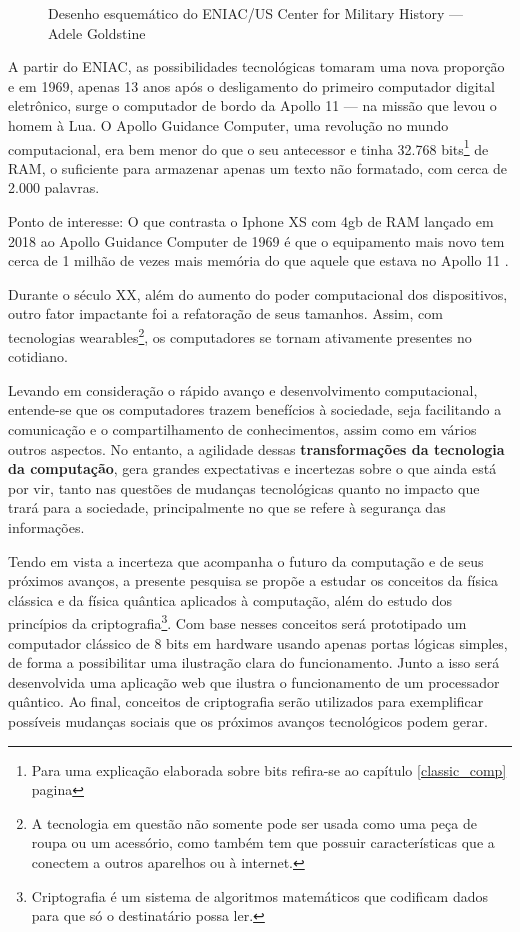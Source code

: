 \vspace{1cm}
\begin{figure}[H] \centering 
  \caption{\label{ENIAC_floor_layout} Desenho esquemático do ENIAC/US Center for Military History — Adele Goldstine} 
\end{figure}

A partir do ENIAC, as possibilidades tecnológicas tomaram uma nova proporção e em 1969, apenas 13 anos após o desligamento do primeiro computador digital eletrônico, surge o computador de bordo da Apollo 11 — na missão que levou o homem à Lua. O Apollo Guidance Computer, uma revolução no mundo computacional, era bem menor do que o seu antecessor e tinha 32.768 bits\footnote{Para uma explicação elaborada sobre bits refira-se ao capítulo \ref{classic_comp} pagina \pageref{bits}} de RAM, o suficiente para armazenar apenas um texto não formatado, com cerca de 2.000 palavras.

Ponto de interesse: O que contrasta o Iphone XS com 4gb de RAM lançado em 2018 ao Apollo Guidance Computer de 1969 é que o equipamento mais novo tem cerca de 1 milhão de vezes  mais memória do que aquele que estava no Apollo 11 \cite{5}.

Durante o século XX, além do aumento do poder computacional dos dispositivos, outro fator impactante foi a refatoração de seus tamanhos. Assim, com tecnologias wearables\footnote{A tecnologia em questão não somente pode ser usada como uma peça de roupa ou um acessório, como também tem que possuir características que a conectem a outros aparelhos ou à internet.}, os computadores se tornam ativamente presentes no cotidiano. 

Levando em consideração o rápido avanço e desenvolvimento computacional, entende-se que os computadores trazem benefícios à sociedade, seja facilitando a comunicação e o compartilhamento de conhecimentos, assim como em vários outros aspectos. No entanto, a agilidade dessas \textbf{transformações da tecnologia da computação}, gera grandes expectativas e incertezas sobre o que ainda está por vir, tanto nas questões de mudanças tecnológicas quanto no impacto que trará para a sociedade, principalmente no que se refere à segurança das informações. 

Tendo em vista a incerteza que acompanha o futuro da computação e de seus próximos avanços, a presente pesquisa se propõe a estudar os conceitos da física clássica e da física quântica aplicados à computação, além do estudo dos princípios da criptografia\footnote{Criptografia é um sistema de algoritmos matemáticos que codificam dados para que só o destinatário possa ler.}. Com base nesses conceitos será prototipado um computador clássico de 8 bits em hardware usando apenas portas lógicas simples, de forma a possibilitar uma ilustração clara do funcionamento. Junto a isso será desenvolvida uma aplicação web que ilustra o funcionamento de um processador quântico. Ao final, conceitos de criptografia serão utilizados para exemplificar possíveis mudanças sociais que os próximos avanços tecnológicos podem gerar.

